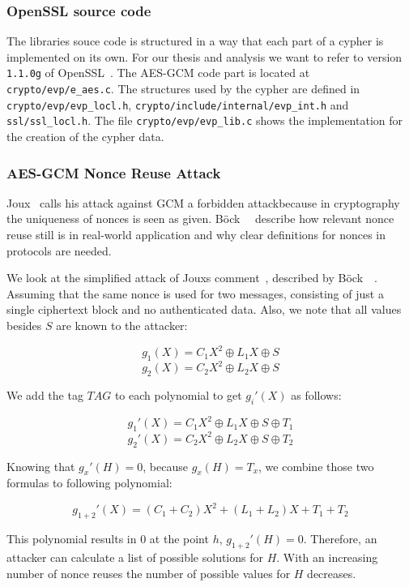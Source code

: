 \subsubsection{OpenSSL source code}

The libraries souce code is structured in a way that each part of a
cypher is implemented on its own. For our thesis and analysis we want to
refer to version \texttt{1.1.0g} of OpenSSL~\cite{opensslsource}. The AES-GCM
code part is located at \texttt{crypto/evp/e\_aes.c}. The structures used by the
cypher are defined in \texttt{crypto/evp/evp\_locl.h},
\texttt{crypto/include/internal/evp\_int.h} and \texttt{ssl/ssl\_locl.h}. The
file \texttt{crypto/evp/evp\_lib.c} shows the implementation for the creation of
the cypher data.

\subsubsection{AES-GCM Nonce Reuse Attack}

Joux~\cite{NISTGCMcomment} calls his attack against GCM \textquotedbl a
forbidden attack\textquotedbl because in cryptography the uniqueness of nonces
is seen as given. Böck~\etal~\cite{gcmnonceattack} describe how relevant nonce
reuse still is in real-world application and why clear definitions for nonces
in protocols are needed.

We look at the simplified attack of Joux\textquotesingle s
comment~\cite{NISTGCMcomment}, described by Böck~\etal~\cite{gcmnonceattack}.
Assuming that the same nonce is used for two messages, consisting of just a
single ciphertext block and no authenticated data. Also, we note that all
values besides $S$ are known to the attacker:

\[g_1(X) = C{_{1}X^2 \oplus L_1X \oplus S}\]
\[g_2(X) = C{_{2}X^2 \oplus L_2X \oplus S}\]

We add the tag $TAG$ to each polynomial to get $g_i'(X)$ as follows:

\[g_1'(X) = C{_{1}X^2 \oplus L_1X \oplus S \oplus T_1}\]
\[g_2'(X) = C{_{2}X^2 \oplus L_2X \oplus S \oplus T_2}\]

Knowing that $g_x'(H) = 0$, because $g_x(H) = T_x$, we combine those two
formulas to following polynomial:

\[g_{1+2}'(X) = (C_{1} + C_{2})X^2 + (L_1 + L_2)X + T_1 + T_2\]

This polynomial results in $0$ at the point $h$, $g_{1+2}'(H) = 0$.
Therefore, an attacker can calculate a list of possible solutions for $H$.
With an increasing number of nonce reuses the number of possible values for $H$
decreases.

